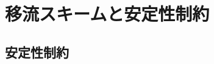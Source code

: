 %

\section{移流スキームと安定性制約}
\label{app:advection_stability}



\subsection{安定性制約}
\label{app:stability_constraints}
